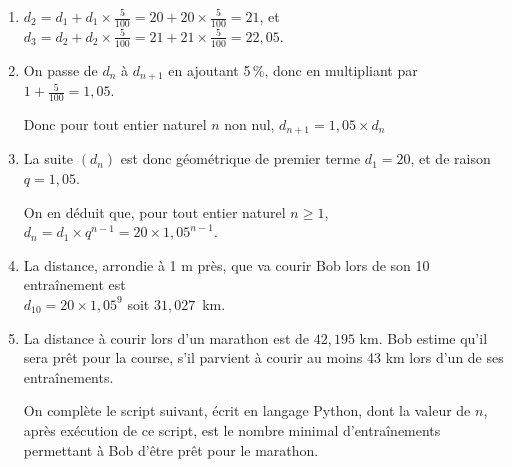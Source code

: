 \begin{enumerate}
\item $d_2 = d_1 + d_1\times \frac{5}{100} =  20 + 20\times \frac{5}{100} = 21$, et
$d_3 = d_2 + d_2\times \frac{5}{100} =  21 + 21\times \frac{5}{100} = 22,05$.

\item %
On passe de $d_n$ à $d_{n+1}$ en ajoutant 5\,\%, donc en multipliant par $1+\frac{5}{100}=1,05$. 

Donc pour tout entier naturel $n$ non nul,  $d_{n+1}= 1,05\times d_n$ 

\item La suite $(d_n)$ est donc géométrique de premier terme $d_1=20$, et de raison $q=1,05$.

 On en déduit que, pour tout entier naturel $n \geqslant 1$, $d_n= d_1\times q^{n-1} = 20\times 1,05^{n-1}$.

\item La distance, arrondie à 1 m près, que va courir Bob lors de son 10\ieme{} entraînement est\\
$d_{10} = 20\times 1,05^{9}$ soit $31,027$~km.

\item La distance à courir lors d'un marathon est de $42,195$ km. Bob estime qu'il sera prêt pour la course, s'il parvient à courir au moins 43 km lors d'un de ses entraînements.

On complète le script suivant, écrit en langage Python, dont la valeur de $n$, après exécution de ce script, est le nombre minimal d'entraînements permettant à Bob d'être prêt pour le marathon.

\begin{center}
\end{center}

\end{enumerate}



